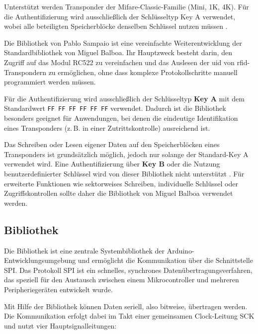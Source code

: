 Unterstützt werden Transponder der Mifare-Classic-Familie (Mini, 1K, 4K). 
Für die Authentifizierung wird ausschließlich der Schlüsseltyp Key A verwendet, 
wobei alle beteiligten Speicherblöcke denselben Schlüssel nutzen müssen \cite{Sampaio:2025}.


\begin{tcolorbox}[colback=gray!10, colframe=gray!60, title={Hinweis zur Bibliothek \PYTHON{Easy MFRC522}}]
	
	Die Bibliothek  von Pablo Sampaio ist eine vereinfachte Weiterentwicklung 
	der Standardbibliothek  von Miguel Balboa. 
	Ihr Hauptzweck besteht darin, den Zugriff auf das Modul RC522 zu vereinfachen 
	und das Auslesen der \ac{uid} von \ac{rfid}-Transpondern zu ermöglichen, 
	ohne dass komplexe Protokollschritte manuell programmiert werden müssen. 
	
	Für die Authentifizierung wird ausschließlich der Schlüsseltyp \textbf{Key A} 
	mit dem Standardwert \texttt{FF FF FF FF FF FF} verwendet. 
	Dadurch ist die Bibliothek besonders geeignet für Anwendungen, 
	bei denen die eindeutige Identifikation eines Transponders (z.\,B. in einer Zutrittskontrolle) 
	ausreichend ist. 
	
	Das Schreiben oder Lesen eigener Daten auf den Speicherblöcken eines Transponders 
	ist grundsätzlich möglich, jedoch nur solange der Standard-Key A verwendet wird. 
	Eine Authentifizierung über \textbf{Key B} oder die Nutzung benutzerdefinierter Schlüssel 
	wird von dieser Bibliothek nicht unterstützt \cite{Sampaio:2025}. 
	Für erweiterte Funktionen wie sektorweises Schreiben, individuelle Schlüssel oder 
	Zugriffskontrollen sollte daher die Bibliothek  von Miguel Balboa verwendet werden.
\end{tcolorbox}



\subsection{Bibliothek }

Die Bibliothek  ist eine zentrale Systembibliothek der Arduino-Entwicklungsumgebung 
und ermöglicht die Kommunikation über die Schnittstelle SPI. 
Das Protokoll SPI ist ein schnelles, synchrones Datenübertragungsverfahren, 
das speziell für den Austausch zwischen einem Mikrocontroller und mehreren Peripheriegeräten entwickelt wurde. 

Mit Hilfe der Bibliothek können Daten seriell, also bitweise, übertragen werden. 
Die Kommunikation erfolgt dabei im Takt einer gemeinsamen Clock-Leitung SCK 
und nutzt vier Hauptsignalleitungen:

